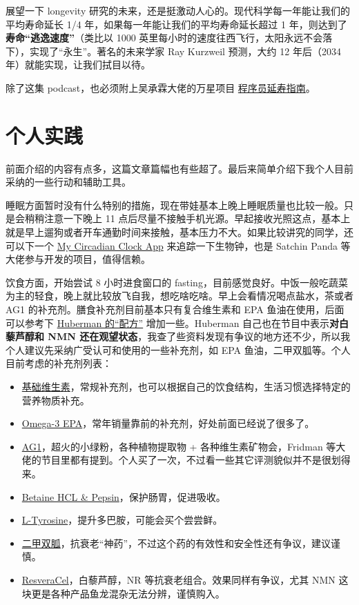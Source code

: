 \documentclass{report}
\begin{document}
展望一下 longevity 研究的未来，还是挺激动人心的。现代科学每一年能让我们的平均寿命延长 1/4 年，如果每一年能让我们的平均寿命延长超过 1 年，则达到了\textbf{寿命“逃逸速度”}（类比以 1000 英里每小时的速度往西飞行，太阳永远不会落下），实现了“永生”。著名的未来学家 Ray Kurzweil 预测，大约 12 年后（2034 年）就能实现，让我们拭目以待。

除了这集 podcast，也必须附上吴承霖大佬的万星项目 \href{https://github.com/geekan/HowToLiveLonger}{程序员延寿指南}。

\chapter{个人实践}

前面介绍的内容有点多，这篇文章篇幅也有些超了。最后来简单介绍下我个人目前采纳的一些行动和辅助工具。

睡眠方面暂时没有什么特别的措施，现在带娃基本上晚上睡眠质量也比较一般。只是会稍稍注意一下晚上 11 点后尽量不接触手机光源。早起接收光照这点，基本上就是早上遛狗或者开车通勤时间来接触，基本压力不大。如果比较讲究的同学，还可以下一个 \href{https://mycircadianclock.org/}{My Circadian Clock App} 来追踪一下生物钟，也是 Satchin Panda 等大佬参与开发的项目，值得信赖。

饮食方面，开始尝试 8 小时进食窗口的 fasting，目前感觉良好。中饭一般吃蔬菜为主的轻食，晚上就比较放飞自我，想吃啥吃啥。早上会看情况喝点盐水，茶或者 AG1 的补充剂。膳食补充剂目前基本只有复合维生素和 EPA 鱼油在使用，后面可以参考下 \href{https://fastlifehacks.com/andrew-huberman-supplements-list/}{Huberman 的“配方”} 增加一些。Huberman 自己也在节目中表示\textbf{对白藜芦醇和 NMN 还在观望状态}，我查了些资料发现有争议的地方还不少，所以我个人建议先采纳广受认可和使用的一些补充剂，如 EPA 鱼油，二甲双胍等。个人目前考虑的补充剂列表：

\begin{itemize}
    \item \href{https://www.thorne.com/products/dp/basic-nutrients-2-day}{基础维生素}，常规补充剂，也可以根据自己的饮食结构，生活习惯选择特定的营养物质补充。
    \item \href{https://www.thorne.com/products/dp/super-epa-sp608nc}{Omega-3 EPA}，常年销量靠前的补充剂，好处前面已经说了很多了。
    \item \href{https://athleticgreens.com/en}{AG1}，超火的小绿粉，各种植物提取物 + 各种维生素矿物会，Fridman 等大佬的节目里都有提到。个人买了一次，不过看一些其它评测貌似并不是很划得来。
    \item \href{https://www.thorne.com/products/dp/betaine-hcl-pepsin-225-s}{Betaine HCL \& Pepsin}，保护肠胃，促进吸收。
    \item \href{https://www.thorne.com/products/dp/l-tyrosine}{L-Tyrosine}，提升多巴胺，可能会买个尝尝鲜。
    \item \href{https://zh.m.wikipedia.org/zh/%E4%BA%8C%E7%94%B2%E5%8F%8C%E8%83%8D}{二甲双胍}，抗衰老“神药”，不过这个药的有效性和安全性还有争议，建议谨慎。
    \item \href{https://www.thorne.com/products/dp/resveracel}{ResveraCel}，白藜芦醇，NR 等抗衰老组合。效果同样有争议，尤其 NMN 这块更是各种产品鱼龙混杂无法分辨，谨慎购入。
\end{itemize}
\end{document}
